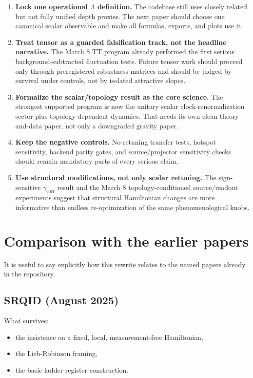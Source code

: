 \documentclass[11pt]{article}
\begin{document}
\begin{enumerate}
    \item \textbf{Lock one operational $\Lambda$ definition.} The codebase still uses closely related but not fully unified depth proxies. The next paper should choose one canonical scalar observable and make all formulas, exports, and plots use it.
    \item \textbf{Treat tensor as a guarded falsification track, not the headline narrative.} The March 8 TT program already performed the first serious background-subtracted fluctuation tests. Future tensor work should proceed only through preregistered robustness matrices and should be judged by survival under controls, not by isolated attractive slopes.
    \item \textbf{Formalize the scalar/topology result as the core science.} The strongest supported program is now the unitary scalar clock-renormalization sector plus topology-dependent dynamics. That needs its own clean theory-and-data paper, not only a downgraded gravity paper.
    \item \textbf{Keep the negative controls.} No-retuning transfer tests, hotspot sensitivity, backend parity gates, and source/projector sensitivity checks should remain mandatory parts of every serious claim.
    \item \textbf{Use structural modifications, not only scalar retuning.} The sign-sensitive $\gamma_{\mathrm{corr}}$ result and the March 8 topology-conditioned source/readout experiments suggest that structural Hamiltonian changes are more informative than endless re-optimization of the same phenomenological knobs.
\end{enumerate}

\section{Comparison with the earlier papers}

It is useful to say explicitly how this rewrite relates to the named papers already in the repository.

\subsection*{SRQID (August 2025)}

What survives:
\begin{itemize}
    \item the insistence on a fixed, local, measurement-free Hamiltonian,
    \item the Lieb-Robinson framing,
    \item the basic ladder-register construction.
\end{itemize}
\end{document}
